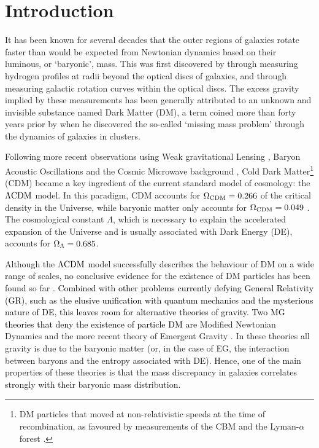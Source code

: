 \documentclass[usenatbib]{mnras}
\newcommand{\lcdm}{{\rm \Lambda CDM}}
\newcommand{\un}[1]{_{\rm #1}}
\begin{document}
\clearpage




\section{Introduction}
\label{sec:introduction}

It has been known for several decades that the outer regions of galaxies rotate faster than would be expected from Newtonian dynamics based on their luminous, or `baryonic', mass. This was first discovered by \cite{bosma1981} through measuring hydrogen profiles at radii beyond the optical discs of galaxies, and \cite{rubin1983} through measuring galactic rotation curves within the optical discs. The excess gravity implied by these measurements has been generally attributed to an unknown and invisible substance named Dark Matter (DM), a term coined more than forty years prior by \cite{zwicky1937} when he discovered the so-called `missing mass problem' through the dynamics of galaxies in clusters.

Following more recent observations using Weak gravitational Lensing \cite[WL,][]{hoekstra2004,linden2014,mandelbaum2015}, Baryon Acoustic Oscillations \cite[BAO's,][]{eisenstein2005,blake2011} and the Cosmic Microwave background \cite[CMB,][]{spergel2003,planck2014}, Cold Dark Matter\footnote{DM particles that moved at non-relativistic speeds at the time of recombination, as favoured by measurements of the CBM \cite[]{planck2014} and the Lyman-$\alpha$ forest \cite[]{viel2013}.} (CDM) became a key ingredient of the current standard model of cosmology: the $\lcdm$ model. In this paradigm, CDM accounts for $\Omega\un{CDM}=0.266$ of the critical density in the Universe, while baryonic matter only accounts for $\Omega\un{CDM}=0.049$ \cite[]{planck2018}. The cosmological constant $\Lambda$, which is necessary to explain the accelerated expansion of the Universe and is usually associated with Dark Energy (DE), accounts for $\Omega\un{\Lambda}=0.685$.

Although the $\lcdm$ model successfully describes the behaviour of DM on a wide range of scales, no conclusive evidence for the existence of DM particles has been found so far \cite[despite years of enormous effort; for an overview, see][]{bertone2005,bertone2018}. \textcolor{black}{Combined with other problems currently defying General Relativity (GR), such as the elusive unification with quantum mechanics and the mysterious nature of DE, this leaves room for alternative theories of gravity. Two MG theories that deny the existence of particle DM are} Modified Newtonian Dynamics \cite[MOND,][]{milgrom1983} and the more recent theory of Emergent Gravity \cite[EG,][]{verlinde2016}. In these theories all gravity is due to the baryonic matter (or, in the case of EG, the interaction between baryons and the entropy associated with DE). Hence, one of the main properties of these theories is that the mass discrepancy in galaxies correlates strongly with their baryonic mass distribution.
\end{document}
